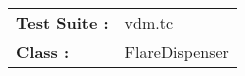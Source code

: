 




















































































\begin{tabular}{p{25mm}l}
{\bf Test Suite :} & vdm.tc \\ 
{\bf Class :} & FlareDispenser \\ 
\end{tabular}

